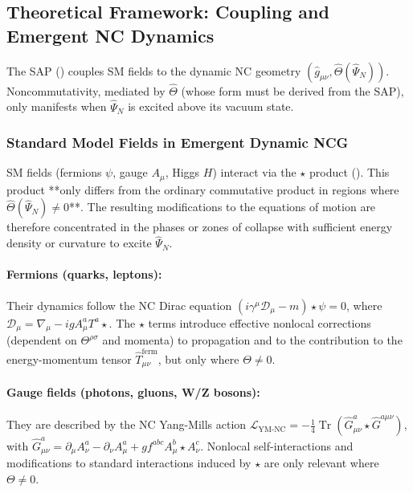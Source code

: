 \documentclass[11pt, a4paper]{article}
\theoremstyle{remark}
\newcommand{\Op}[1]{\hat{#1}}
\DeclareMathOperator{\Tr}{Tr}
\begin{document}
\subsection{Theoretical Framework: Coupling and Emergent NC Dynamics}
\label{subsec:collapse_theory}

The SAP () couples SM fields to the dynamic NC geometry \((\Op{g}_{\mu\nu}, \Op{\Theta}(\Op{\Psi}_N))\). Noncommutativity, mediated by \( \Op{\Theta} \) (whose form must be derived from the SAP), only manifests when \( \Op{\Psi}_N \) is excited above its vacuum state.

\subsubsection{Standard Model Fields in Emergent Dynamic NCG}
\label{ssubsec:sm_coupling_nc}

SM fields (fermions \(\psi\), gauge \(A_\mu\), Higgs \(H\)) interact via the \( \star \) product (). This product **only differs from the ordinary commutative product in regions where \( \Op{\Theta}(\Op{\Psi}_N) \neq 0 \)**. The resulting modifications to the equations of motion are therefore concentrated in the phases or zones of collapse with sufficient energy density or curvature to excite \( \Op{\Psi}_N \).

\paragraph{Fermions (quarks, leptons):} Their dynamics follow the NC Dirac equation \( ( i\gamma^\mu \mathcal{D}_\mu - m ) \star \psi = 0 \), where \( \mathcal{D}_\mu = \nabla_\mu - i g A^a_\mu T^a \star \). The \( \star \) terms introduce effective nonlocal corrections (dependent on \( \Theta^{\rho\sigma} \) and momenta) to propagation and to the contribution to the energy-momentum tensor \( \hat{T}_{\mu\nu}^{\text{ferm}} \), but only where \( \Theta \neq 0 \).

\paragraph{Gauge fields (photons, gluons, W/Z bosons):} They are described by the NC Yang-Mills action \( \mathcal{L}_{\text{YM-NC}} = -\frac{1}{4} \Tr( \hat{G}^a_{\mu\nu} \star \hat{G}^{a\mu\nu} ) \), with \( \hat{G}^a_{\mu\nu} = \partial_\mu A^a_\nu - \partial_\nu A^a_\mu + g f^{abc} A^b_\mu \star A^c_\nu \). Nonlocal self-interactions and modifications to standard interactions induced by \( \star \) are only relevant where \( \Theta \neq 0 \).
\end{document}
